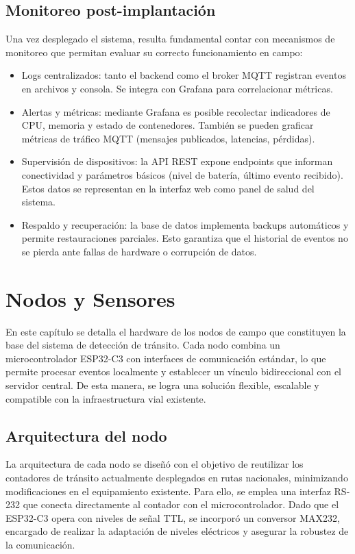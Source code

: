 \subsection{Monitoreo post-implantación}

Una vez desplegado el sistema, resulta fundamental contar con mecanismos de monitoreo que permitan evaluar su correcto funcionamiento en campo:  

\begin{itemize}
    \item Logs centralizados: tanto el backend como el broker MQTT registran eventos en archivos y consola. Se  integra con Grafana para correlacionar métricas.
    
    \item Alertas y métricas: mediante Grafana es posible recolectar indicadores de CPU, memoria y estado de contenedores. También se pueden graficar métricas de tráfico MQTT (mensajes publicados, latencias, pérdidas).
    
    \item Supervisión de dispositivos: la API REST expone endpoints que informan conectividad y parámetros básicos (nivel de batería, último evento recibido). Estos datos se representan en la interfaz web como panel de salud del sistema.
    
    \item Respaldo y recuperación: la base de datos implementa backups automáticos y permite restauraciones parciales. Esto garantiza que el historial de eventos no se pierda ante fallas de hardware o corrupción de datos.
\end{itemize}


\section{Nodos y Sensores}
\label{sec:nodos-sensores}

\label{sec:nodos-sensores}

En este capítulo se detalla el hardware de los nodos de campo que constituyen la base del sistema de detección de tránsito. Cada nodo combina un microcontrolador ESP32-C3 con interfaces de comunicación estándar, lo que permite procesar eventos localmente y establecer un vínculo bidireccional con el servidor central. De esta manera, se logra una solución flexible, escalable y compatible con la infraestructura vial existente.

\subsection{Arquitectura del nodo}
La arquitectura de cada nodo se diseñó con el objetivo de reutilizar los contadores de tránsito actualmente desplegados en rutas nacionales, minimizando modificaciones en el equipamiento existente. Para ello, se emplea una interfaz RS-232 que conecta directamente al contador con el microcontrolador. Dado que el ESP32-C3 opera con niveles de señal TTL, se incorporó un conversor MAX232, encargado de realizar la adaptación de niveles eléctricos y asegurar la robustez de la comunicación.

